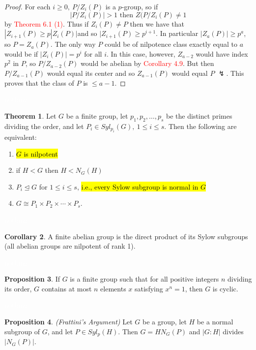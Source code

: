 \documentclass{article}
\theoremstyle{definition}
\newtheorem{thm}{Theorem}[section]
\newtheorem{prop}[thm]{Proposition}
\newtheorem{cor}[thm]{Corollary}
\newcommand{\nl}{\textcolor{white}{nothing}}
\begin{document}
\begin{proof}
For each $i\geq 0,\ P/Z_i(P)$ is a $p$-group, so if 
\[|P/Z_i(P)| > 1\text{ then } Z(P/Z_i(P)\neq 1\]
by \textcolor{red}{Theorem 6.1 (1)}. Thus if $Z_i(P)\neq P$ then we have that $|Z_{i + 1}(P) \geq p|Z_i(P)|$and so $|Z_{i+1}(P)\geq p^{i+1}$. In particular $|Z_a(P)|\geq p^a$, so $P = Z_a(P)$. The only way $P$ could be of nilpotence class exactly equal to $a$ would be if $|Z_i(P)| = p^i$ for all $i$. In this case, however, $Z_{a-2}$ would have index $p^2$ in $P$, so $P/Z_{a-2}(P)$ would be abelian by \textcolor{red}{Corollary 4.9}. But then $P/Z_{a-1}(P)$ would equal its center and so $Z_{a-1}(P)$ would equal $P$ $\lightning$. This proves that the class of $P$ is $\leq a-1$.
\end{proof}

\nl

\begin{thm}
Let $G$ be a finite group, let $p_1, p_2, \ldots,p_s$ be the distinct primes dividing the order, and let $P_i\in Syl_{p_i}(G),\ 1\leq i\leq s$. Then the following are equivalent:
\begin{enumerate}
\item \hl{$G$ is nilpotent}
\item if $H<G$ then $H<N_G(H)$
\item $P_i\unlhd G$ for $1\leq i\leq s$, \hl{i.e., every Sylow subgroup is normal in $G$}
\item $G\cong P_1\times P_2\times \cdots\times P_s$.
\end{enumerate}
\end{thm}

\nl

\begin{cor}
A finite abelian group is the direct product of its Sylow subgroups (all abelian groups are nilpotent of rank 1).
\end{cor}


\nl

\begin{prop}
If $G$ is a finite group such that for all positive integers $n$ dividing its order, $G$ contains at most $n$ elements $x$ satisfying $x^n = 1$, then $G$ is cyclic.
\end{prop}

\nl

\begin{prop}\textit{(Frattini's Argument)}
Let $G$ be a group, let $H$ be a normal subgroup of $G$, and let $P\in Syl_p(H)$. Then $G=HN_G(P)$ and $|G:H|$ divides $|N_G(P)|$.
\end{prop}
\end{document}

